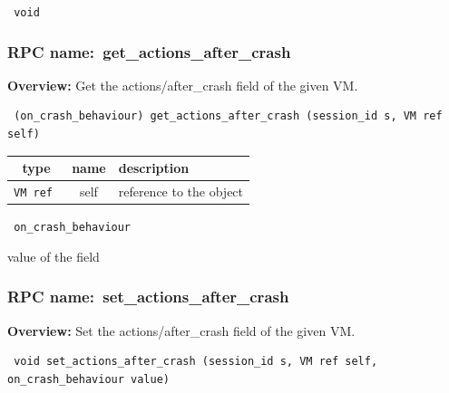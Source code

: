 \vspace{0.3cm}

{\tt 
void
}



\vspace{0.3cm}
\vspace{0.3cm}
\vspace{0.3cm}
\subsubsection{RPC name:~get\_actions\_after\_crash}

{\bf Overview:} 
Get the actions/after\_crash field of the given VM.

\begin{verbatim} (on_crash_behaviour) get_actions_after_crash (session_id s, VM ref self)\end{verbatim}



 
\vspace{0.3cm}
\begin{tabular}{|c|c|p{7cm}|}
 \hline
{\bf type} & {\bf name} & {\bf description} \\ \hline
{\tt VM ref } & self & reference to the object \\ \hline 

\end{tabular}

\vspace{0.3cm}

{\tt 
on\_crash\_behaviour
}


value of the field
\vspace{0.3cm}
\vspace{0.3cm}
\vspace{0.3cm}
\subsubsection{RPC name:~set\_actions\_after\_crash}

{\bf Overview:} 
Set the actions/after\_crash field of the given VM.

\begin{verbatim} void set_actions_after_crash (session_id s, VM ref self, on_crash_behaviour value)\end{verbatim}



